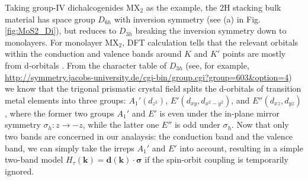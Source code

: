 Taking group-IV dichalcogenides MX$_2$ as the example, the 2H stacking bulk material has space group $D_{6h}$ with inversion symmetry (see (a) in Fig. \ref{fig:MoS2_Di}), but reduces to $D_{3h}$ breaking the inversion symmetry down to monolayers. For monolayer MX$_2$, DFT calculation tells that the relevant orbitals within the conduction and valence bands around $K$ and $K'$ points are mostly from d-orbitals \cite{mattheiss1973band}. From the character table of $D_{3h}$ (see, for example, \url{http://symmetry.jacobs-university.de/cgi-bin/group.cgi?group=603&option=4})
we know that the trigonal prismatic crystal field splits the d-orbitals of transition metal elements into three groups: $A_1'(d_{z^2})$, $E'(d_{xy}, d_{x^2-y^2})$, and $E''(d_{xz}, d_{yz})$, where the former two groups $A_1'$ and $E'$ is even under the in-plane mirror symmetry $\sigma_h: z\rightarrow-z$, while the latter one $E''$ is odd under $\sigma_h$. Now that only two bands are concerned in our analaysis: the conduction band and the valence band, we can simply take the irreps $A_1'$ and $E'$ into account, resulting in a simple two-band model $H_\tau(\bm k)=\bm d(\bm k)\cdot\bm\sigma$ if the spin-orbit coupling is temporarily ignored.

